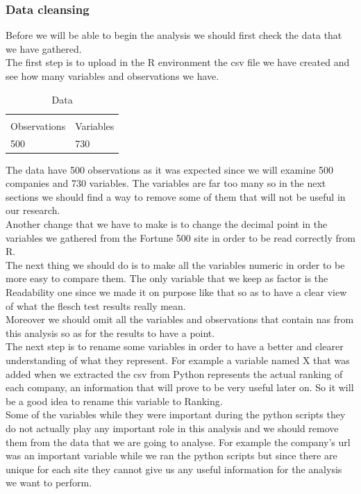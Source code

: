 \documentclass{article}
\begin{document}
\subsubsection{Data cleansing}
Before we will be able to begin the analysis we should first check the data that we have gathered.\\
The first step is to upload in the R environment the csv file we have created and see how many variables and observations we have.
\begin{table}[H]
\centering
\caption{Data}
\begin{tabular}{ll}
  & \\
Observations & Variables \\
500 & 730 \\
\end{tabular}
\end{table}
The data have 500 observations as it was expected since we will examine 500 companies and 730 variables. The variables are far too many so in the next sections we should find a way to remove some of them that will not be useful in our research.\\
Another change that we have to make is to change the decimal point in the variables we gathered from the Fortune 500 site in order to be read correctly from R.\\
The next thing we should do is to make all the variables numeric in order to be more easy to compare them. The only variable that we keep as factor is the Readability one since we made it on purpose like that so as to have a clear view of what the flesch test results really mean.\\
Moreover we should omit all the variables and observations that contain nas from this analysis so as for the results to have a point.\\
The next step is to rename some variables in order to have a better and clearer understanding of what they represent. For example a variable named X that was added when we extracted the csv from Python represents the actual ranking of each company, an information that will prove to be very useful later on. So it will be a good idea to rename this variable to Ranking.\\
Some of the variables while they were important during the python scripts they do not actually play any important role in this analysis and we should remove them from the data that we are going to analyse. For example the company's url was an important variable while we ran the python scripts but since there are unique for each site they cannot give us any useful information for the analysis we want to perform.\\
\end{document}
